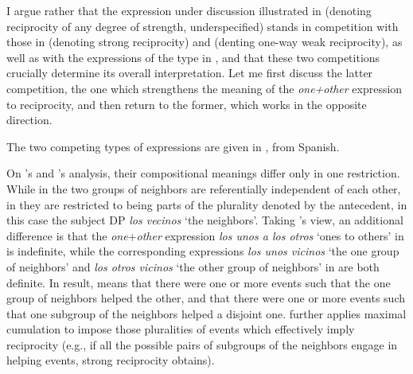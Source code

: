 \documentclass[output=paper,colorlinks,citecolor=brown]{langscibook}
\begin{document}
\noindent I argue rather that the expression under discussion illustrated in  (denoting reciprocity of any degree of strength, underspecified) stands in competition with those in  (denoting strong reciprocity) and  (denting one-way weak reciprocity), as well as with the expressions of the type in , and that these two competitions crucially determine its overall interpretation. Let me first discuss the latter competition, the one which strengthens the meaning of the \textit{one+other} expression to reciprocity, and then return to the former, which works in the opposite direction.

The two competing types of expressions are given in , from Spanish. 

\ea\label{ex:Otros}
\label{ex:Otros-a}

\label{ex:Otros-b}
 \z \z

\noindent On \citeauthor{v10}'s and \citeauthor{z14}'s analysis, their compositional meanings differ only in one restriction. While in  the two groups of neighbors are referentially independent of each other, in  they are restricted to being parts of the plurality denoted by the antecedent, in this case the subject DP \textit{los vecinos} `the neighbors'. Taking \citeauthor{v10}'s view, an additional difference is that the \textit{one}+\textit{other} expression \textit{los unos a los otros} `ones to others' in  is indefinite, while the corresponding expressions \textit{los unos vicinos} `the one group of neighbors' and \textit{los otros vicinos} `the other group of neighbors' in  are both definite. In result,  means that there were one or more events such that the one group of neighbors helped the other, and  that there were one or more events such that one subgroup of the neighbors helped a disjoint one. \citeauthor{v10} further applies ma\-ximal cumulation to impose those pluralities of events which effectively imply reciprocity (e.g., if all the possible pairs of subgroups of the neighbors engage in helping events, strong reciprocity obtains). 
\end{document}
